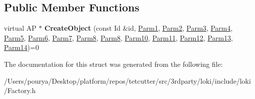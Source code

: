 \subsection*{Public Member Functions}
\begin{DoxyCompactItemize}
\item 
\hypertarget{structLoki_1_1FactoryImpl_3_01AP_00_01Id_00_01LOKI__TYPELIST__14_07P1_00_01P2_00_01P3_00_01P4_00ffe9f7654c2917213926c996b21bf7a6_adb92bdec60047460fdf2982711b1257b}{}virtual A\+P $\ast$ {\bfseries Create\+Object} (const Id \&id, \hyperlink{classLoki_1_1EmptyType}{Parm1}, \hyperlink{classLoki_1_1EmptyType}{Parm2}, \hyperlink{classLoki_1_1EmptyType}{Parm3}, \hyperlink{classLoki_1_1EmptyType}{Parm4}, \hyperlink{classLoki_1_1EmptyType}{Parm5}, \hyperlink{classLoki_1_1EmptyType}{Parm6}, \hyperlink{classLoki_1_1EmptyType}{Parm7}, \hyperlink{classLoki_1_1EmptyType}{Parm8}, \hyperlink{classLoki_1_1EmptyType}{Parm8}, \hyperlink{classLoki_1_1EmptyType}{Parm10}, \hyperlink{classLoki_1_1EmptyType}{Parm11}, \hyperlink{classLoki_1_1EmptyType}{Parm12}, \hyperlink{classLoki_1_1EmptyType}{Parm13}, \hyperlink{classLoki_1_1EmptyType}{Parm14})=0\label{structLoki_1_1FactoryImpl_3_01AP_00_01Id_00_01LOKI__TYPELIST__14_07P1_00_01P2_00_01P3_00_01P4_00ffe9f7654c2917213926c996b21bf7a6_adb92bdec60047460fdf2982711b1257b}

\end{DoxyCompactItemize}


The documentation for this struct was generated from the following file\+:\begin{DoxyCompactItemize}
\item 
/\+Users/pourya/\+Desktop/platform/repos/tetcutter/src/3rdparty/loki/include/loki/Factory.\+h\end{DoxyCompactItemize}
